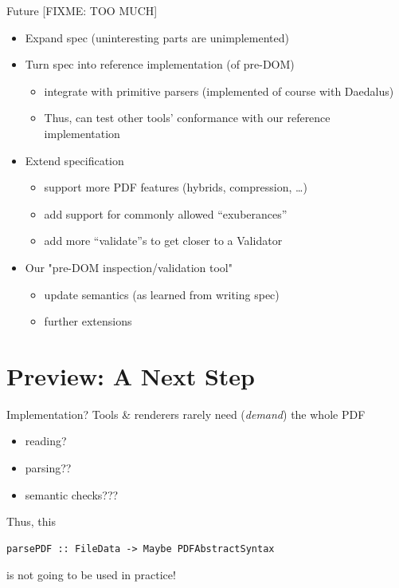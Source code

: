 \documentclass[t,10pt,xcolor={dvipsnames}]{beamer}
\begin{document}
\begin{frame}[label={sec:org01e5006}]{Future [FIXME: TOO MUCH]}
\begin{itemize}
\item Expand spec (uninteresting parts are unimplemented)
\item Turn spec into reference implementation (of pre-DOM)
\begin{itemize}
\item integrate with primitive parsers (implemented of course with Daedalus)
\item Thus, can test other tools’ conformance with our reference implementation
\end{itemize}
\item Extend specification
\begin{itemize}
\item support more PDF features (hybrids, compression, …)
\item add support for commonly allowed “exuberances”
\item add more “validate”s to get closer to a Validator
\end{itemize}
\item Our "pre-DOM inspection/validation tool"
\begin{itemize}
\item update semantics (as learned from writing spec)
\item further extensions
\end{itemize}
\end{itemize}
\end{frame}

\section{Preview: A Next Step}
\label{sec:orgeb95292}
\begin{frame}[label={sec:org2fcd0ee},fragile]{Implementation?}
 Tools \& renderers rarely need (\emph{demand}) the whole PDF
\begin{itemize}
\item reading?
\item parsing??
\item semantic checks???
\end{itemize}
\vspace{12pt}

Thus, this
\lstset{language=haskell,label= ,caption= ,captionpos=b,numbers=none}
\begin{lstlisting}
parsePDF :: FileData -> Maybe PDFAbstractSyntax
\end{lstlisting}
is not going to be used in practice!     
\end{frame}
\end{document}
